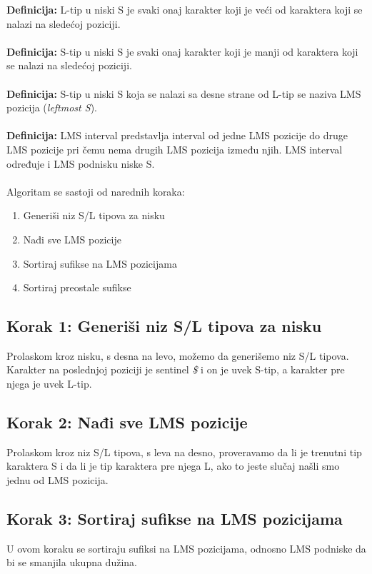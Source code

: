 \documentclass{article}
\begin{document}
\textbf{Definicija:} L-tip u niski S je svaki onaj karakter koji je veći od karaktera koji se nalazi na sledećoj poziciji.\\\\

\textbf{Definicija:} S-tip u niski S je svaki onaj karakter koji je manji od karaktera koji se nalazi na sledećoj poziciji.\\\\

\textbf{Definicija:} S-tip u niski S koja se nalazi sa desne strane od L-tip se naziva LMS pozicija (\textit{leftmost S}).\\\\

\textbf{Definicija:} LMS interval predstavlja interval od jedne LMS pozicije do druge LMS pozicije pri čemu nema drugih LMS pozicija između njih. LMS interval određuje i LMS podnisku niske S.\\\\

Algoritam se sastoji od narednih koraka:
\begin{enumerate}
    \item Generiši niz S/L tipova za nisku
    \item Nađi sve LMS pozicije
    \item Sortiraj sufikse na LMS pozicijama
    \item Sortiraj preostale sufikse
\end{enumerate}

\subsection{Korak 1: Generiši niz S/L tipova za nisku}
Prolaskom kroz nisku, s desna na levo, možemo da generišemo niz S/L tipova. Karakter na poslednjoj poziciji je sentinel \textit{\$} i on je uvek S-tip, a karakter pre njega je uvek L-tip.

\subsection{Korak 2: Nađi sve LMS pozicije}
Prolaskom kroz niz S/L tipova, s leva na desno, proveravamo da li je trenutni tip karaktera S i da li je tip karaktera pre njega L, ako to jeste slučaj našli smo jednu od LMS pozicija.

\subsection{Korak 3: Sortiraj sufikse na LMS pozicijama}
U ovom koraku se sortiraju sufiksi na LMS pozicijama, odnosno LMS podniske da bi se smanjila ukupna dužina.
\end{document}
